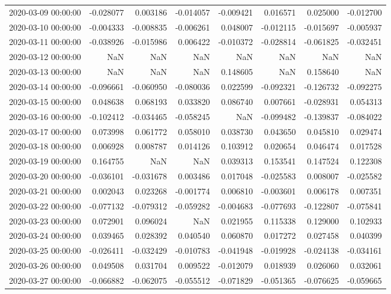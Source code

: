 \begin{tabular}{lrrrrrrr}
2020-03-09 00:00:00 & -0.028077 & 0.003186 & -0.014057 & -0.009421 & 0.016571 & 0.025000 & -0.012700 \\
2020-03-10 00:00:00 & -0.004333 & -0.008835 & -0.006261 & 0.048007 & -0.012115 & -0.015697 & -0.005937 \\
2020-03-11 00:00:00 & -0.038926 & -0.015986 & 0.006422 & -0.010372 & -0.028814 & -0.061825 & -0.032451 \\
2020-03-12 00:00:00 & NaN & NaN & NaN & NaN & NaN & NaN & NaN \\
2020-03-13 00:00:00 & NaN & NaN & NaN & 0.148605 & NaN & 0.158640 & NaN \\
2020-03-14 00:00:00 & -0.096661 & -0.060950 & -0.080036 & 0.022599 & -0.092321 & -0.126732 & -0.092275 \\
2020-03-15 00:00:00 & 0.048638 & 0.068193 & 0.033820 & 0.086740 & 0.007661 & -0.028931 & 0.054313 \\
2020-03-16 00:00:00 & -0.102412 & -0.034465 & -0.058245 & NaN & -0.099482 & -0.139837 & -0.084022 \\
2020-03-17 00:00:00 & 0.073998 & 0.061772 & 0.058010 & 0.038730 & 0.043650 & 0.045810 & 0.029474 \\
2020-03-18 00:00:00 & 0.006928 & 0.008787 & 0.014126 & 0.103912 & 0.020654 & 0.046474 & 0.017528 \\
2020-03-19 00:00:00 & 0.164755 & NaN & NaN & 0.039313 & 0.153541 & 0.147524 & 0.122308 \\
2020-03-20 00:00:00 & -0.036101 & -0.031678 & 0.003486 & 0.017048 & -0.025583 & 0.008007 & -0.025582 \\
2020-03-21 00:00:00 & 0.002043 & 0.023268 & -0.001774 & 0.006810 & -0.003601 & 0.006178 & 0.007351 \\
2020-03-22 00:00:00 & -0.077132 & -0.079312 & -0.059282 & -0.004683 & -0.077693 & -0.122807 & -0.075841 \\
2020-03-23 00:00:00 & 0.072901 & 0.096024 & NaN & 0.021955 & 0.115338 & 0.129000 & 0.102933 \\
2020-03-24 00:00:00 & 0.039465 & 0.028392 & 0.040540 & 0.060870 & 0.017272 & 0.027458 & 0.040399 \\
2020-03-25 00:00:00 & -0.026411 & -0.032429 & -0.010783 & -0.041948 & -0.019928 & -0.024138 & -0.034161 \\
2020-03-26 00:00:00 & 0.049508 & 0.031704 & 0.009522 & -0.012079 & 0.018939 & 0.026060 & 0.032061 \\
2020-03-27 00:00:00 & -0.066882 & -0.062075 & -0.055512 & -0.071829 & -0.051365 & -0.076625 & -0.059665 \\

\end{tabular}
